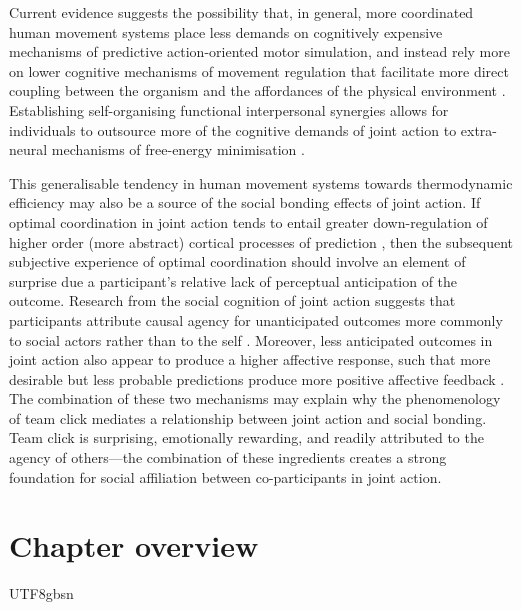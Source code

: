 \begin{CJK}{UTF8}{gbsn}
Current evidence suggests the possibility that, in general, more coordinated human movement systems place less demands on cognitively expensive mechanisms of predictive action-oriented motor simulation, and instead rely more on lower cognitive mechanisms of movement regulation that facilitate more direct coupling between the organism and the affordances of the physical environment \citep{Bourbousson2011,RKiouak2016}.  Establishing self-organising functional interpersonal synergies allows for individuals to outsource more of the cognitive demands of joint action to extra-neural mechanisms of free-energy minimisation \citep{Clark2013}.

This generalisable tendency in human movement systems towards thermodynamic efficiency may also be a source of the social bonding effects of joint action.  If optimal coordination in joint action tends to entail greater down-regulation of higher order (more abstract) cortical processes of prediction \citep{Dietrich2004b}, then the subsequent subjective experience of optimal coordination should involve an element of surprise due a participant's relative lack of perceptual anticipation of the outcome.  Research from the social cognition of joint action suggests that participants attribute causal agency for unanticipated outcomes more commonly to social actors rather than to the self \citep{Sato2008}.  Moreover, less anticipated outcomes in joint action also appear to produce a higher affective response, such that more desirable but less probable predictions produce more positive affective feedback \citep{Chetverikov2016}.  The combination of these two mechanisms may explain why the phenomenology of team click mediates a relationship between joint action and social bonding.  Team click is surprising, emotionally rewarding, and readily attributed to the agency of others---the combination of these ingredients creates a strong foundation for social affiliation between co-participants in joint action.


\section{Chapter overview}


                                              \end{CJK}{UTF8}{gbsn}
